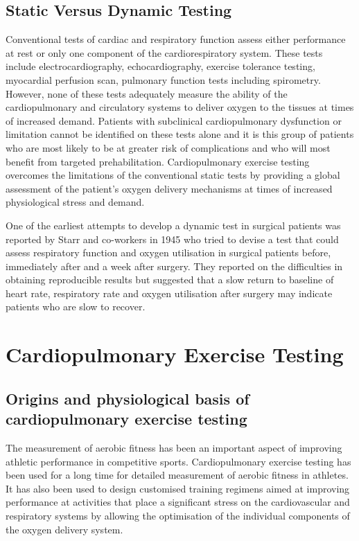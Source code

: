 \subsection{Static Versus Dynamic Testing}

Conventional tests of cardiac and respiratory function assess either performance at rest or only one component of the cardiorespiratory system. 
These tests include electrocardiography, echocardiography, exercise tolerance testing, myocardial perfusion scan, pulmonary function tests including spirometry. 
However, none of these tests adequately measure the ability of the cardiopulmonary and circulatory systems to deliver oxygen to the tissues at times of increased demand. 
Patients with subclinical cardiopulmonary dysfunction or limitation cannot be identified on these tests alone and it is this group of patients who are most likely to be at greater risk of complications and who will most benefit from targeted prehabilitation. 
Cardiopulmonary exercise testing overcomes the limitations of the conventional static tests by providing a global assessment of the patient's oxygen delivery mechanisms at times of increased physiological stress and demand. 

One of the earliest attempts to develop a dynamic test in surgical patients was reported by Starr and co-workers in 1945 who tried to devise a test that could assess respiratory function and oxygen utilisation in surgical patients before, immediately after and a week after surgery. 
They reported on the difficulties in obtaining reproducible results but suggested that a slow return to baseline of heart rate, respiratory rate and oxygen utilisation after surgery may indicate patients who are slow to recover. \parencite{starr_convalescence_1945}

\section{Cardiopulmonary Exercise Testing}

\subsection{Origins and physiological basis of cardiopulmonary exercise testing}
The measurement of aerobic fitness has been an important aspect of improving athletic performance in competitive sports. 
Cardiopulmonary exercise testing has been used for a long time for detailed measurement of aerobic fitness in athletes. 
It has also been used to design customised training regimens aimed at improving performance at activities that place a significant stress on the cardiovascular and respiratory systems by allowing the optimisation of the individual components of the oxygen delivery system.


